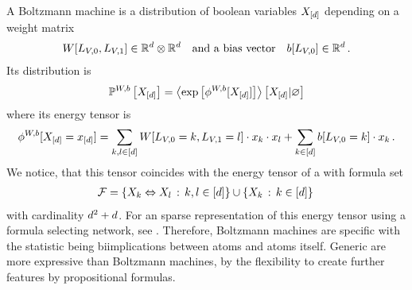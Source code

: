 A Boltzmann machine is a distribution of boolean variables $X_{[d]}$ depending on a weight matrix %
\begin{align*}
    W[L_{V,0},L_{V,1}] \in\mathbb{R}^{d}\otimes\mathbb{R}^{d}
    \quad \text{and a bias vector} \quad b[L_{V,0}] \in\mathbb{R}^{d} \, .
\end{align*}
Its distribution is
\begin{align*}
    \mathbb{P}^{W,b}\left[X_{[d]}\right] = \left\langle \mathrm{exp}\left[\phi^{W,b}[X_{[d]}]\right]\right\rangle \left[ X_{[d]} | \varnothing \right]
\end{align*}
where its energy tensor is
\begin{align*}
    \phi^{W,b}[X_{[d]}=x_{[d]}] =
    \sum_{k,l \in [d]}
    W[L_{V,0}=k, L_{V,1}=l] \cdot x_{k} \cdot x_{l}
    + \sum_{k\in[d]} b[L_{V,0}=k] \cdot x_{k}\, .
\end{align*}
We notice, that this tensor coincides with the energy tensor of a \MarkovLogicNetwork{} with formula set
\begin{align*}
    \mathcal{F} = \{ X_{k} \Leftrightarrow X_{l} \,:\, k,l \in[d] \}
    \cup \{ X_{k}\,:\, k\in[d] \} \,
\end{align*}
with cardinality $d^2+d$.
For an sparse representation of this energy tensor using a formula selecting network, see .
Therefore, Boltzmann machines are specific \MarkovLogicNetworks{} with the statistic being biimplications between atoms and atoms itself.
Generic \MarkovLogicNetworks{} are more expressive than Boltzmann machines, by the flexibility to create further features by propositional formulas.


